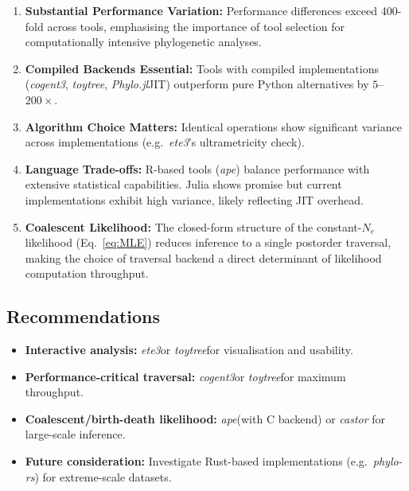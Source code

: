 \documentclass[11pt, a4paper]{article}
\newcommand{\ape}{\textit{ape}}
\newcommand{\cogent}{\textit{cogent3}}
\newcommand{\ete}{\textit{ete3}}
\newcommand{\toytree}{\textit{toytree}}
\newcommand{\phylo}{\textit{Phylo.jl}}
\newcommand{\phylors}{\textit{phylo-rs}}
\newcommand{\castor}{\textit{castor}}
\begin{document}
\begin{enumerate}
    \item \textbf{Substantial Performance Variation:} Performance differences exceed
          400-fold across tools, emphasising the importance of tool selection for
          computationally intensive phylogenetic analyses.

    \item \textbf{Compiled Backends Essential:} Tools with compiled implementations
          (\cogent, \toytree, \phylo JIT) outperform pure Python alternatives by
          $5$--$200\times$.

    \item \textbf{Algorithm Choice Matters:} Identical operations show significant
          variance across implementations (e.g.\ \ete's ultrametricity check).

    \item \textbf{Language Trade-offs:} R-based tools (\ape) balance performance with
          extensive statistical capabilities. Julia shows promise but current
          implementations exhibit high variance, likely reflecting JIT overhead.

    \item \textbf{Coalescent Likelihood:} The closed-form structure of the constant-$N_e$
          likelihood (Eq.~\ref{eq:MLE}) reduces inference to a single postorder
          traversal, making the choice of traversal backend a direct determinant of
          likelihood computation throughput.
\end{enumerate}

\subsection{Recommendations}

\begin{itemize}
    \item \textbf{Interactive analysis:} \ete or \toytree for visualisation and usability.
    \item \textbf{Performance-critical traversal:} \cogent or \toytree for maximum
          throughput.
    \item \textbf{Coalescent/birth-death likelihood:} \ape (with C backend) or \castor
          for large-scale inference.
    \item \textbf{Future consideration:} Investigate Rust-based implementations
          (e.g.\ \phylors) for extreme-scale datasets.
\end{itemize}
\end{document}
